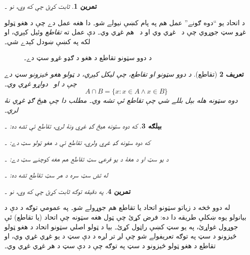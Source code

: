 \documentclass[12pt,a4paper]{article}
\newcommand{\Setabs}[2]{\{#1 : #2\}}
\newcommand{\ollabel}[1]{\label{\pspart:\pschapter:\pssection:#1}}
\newcommand{\olasset}[1]{\centering\begin{LTR}\centering\resizebox{.46\textwidth}{!}{}\end{LTR}}
\newenvironment{explain}{}{}
\newtheorem{defn}{تعريف}[section]
\newtheorem{ex}[defn]{بېلګه}
\newtheorem{prob}[defn]{تمرين}
\begin{document}
\begin{prob}
ثابت کړئ چې که  وي، نو ۔
\end{prob}

\begin{explain}
د اتحاد يو ``دوه ګونے'' عمل هم په پام کښې نيولے شو۔ دا هغه عمل دے چې د هغو ټولو غړو سټ جوړوي چې د~ غړي وي او د~ هم غړي وي۔ دې عمل ته \emph{تقاطع} وئيل کېږي، او لکه په  کښې ښودل کېدے شي۔
\begin{figure}
  \olasset{assets/diagrams/intersection.tikz}
  \caption{د دوو سټونو تقاطع  د هغو د ګډو غړو سټ دے۔}
  \ollabel{fig:intersection}
\end{figure}
\end{explain}

\begin{defn}[تقاطع]
د دوو سټونو  او  \emph{تقاطع}، چې  ليکل کېږي، د ټولو هغو څيزونو سټ دے چې د  او~ دواړو غړي وي۔
\[
A \cap B = \Setabs{x}{x \in A \land x \in B}
\]
دوه سټونه هله \emph{بېل} بللے شي چې تقاطع ئې تشه وي۔ مطلب دا چې هېڅ ګډ غړي نۀ لري۔
\end{defn}

\begin{ex}
که دوه سټونه هېڅ ګډ غړي ونۀ لري، تقاطع ئې تشه ده: ۔

که دوه سټونه ګډ غړي ولري، تقاطع ئې د هغو ټولو سټ دے: ۔

د يو سټ او د هغۀ د يو فرعي سټ تقاطع هم هغه کوچنے سټ دے: ۔

له تش سټ سره د هر سټ تقاطع تشه ده: ۔
\end{ex}

\begin{prob}
په دقيقه توګه ثابت کړئ چې که  وي، نو ۔
\end{prob}

\begin{explain}
له دوو څخه د زياتو سټونو اتحاد يا تقاطع هم جوړولے شو۔ په عمومي توګه د دې د بيانولو يوه ښکلې طريقه دا ده: فرض کړئ چې ټول هغه سټونه چې اتحاد (يا تقاطع) ئې جوړول غواړئ، په يو سټ کښې راټول کړئ۔ بيا د ټولو اصلي سټونو اتحاد د هغو ټولو څيزونو د سټ په توګه تعريفولے شو چې لږ تر لږه د دې سټ د يو غړي غړي وي، او تقاطع د هغو ټولو څيزونو د سټ په توګه چې د دې سټ د هر غړي غړي وي۔
\end{explain}
\end{document}
